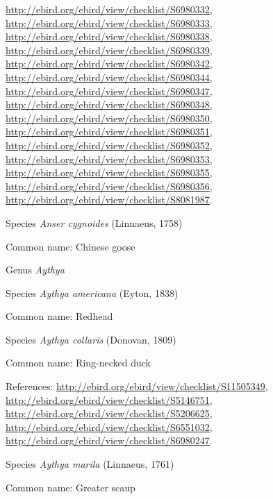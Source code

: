 \documentclass[9pt, article]{memoir}
\begin{document}
\begin{multicols}{2}
\url{http://ebird.org/ebird/view/checklist/S6980332}, 
\url{http://ebird.org/ebird/view/checklist/S6980333}, 
\url{http://ebird.org/ebird/view/checklist/S6980338}, 
\url{http://ebird.org/ebird/view/checklist/S6980339}, 
\url{http://ebird.org/ebird/view/checklist/S6980342}, 
\url{http://ebird.org/ebird/view/checklist/S6980344}, 
\url{http://ebird.org/ebird/view/checklist/S6980347}, 
\url{http://ebird.org/ebird/view/checklist/S6980348}, 
\url{http://ebird.org/ebird/view/checklist/S6980350}, 
\url{http://ebird.org/ebird/view/checklist/S6980351}, 
\url{http://ebird.org/ebird/view/checklist/S6980352}, 
\url{http://ebird.org/ebird/view/checklist/S6980353}, 
\url{http://ebird.org/ebird/view/checklist/S6980355}, 
\url{http://ebird.org/ebird/view/checklist/S6980356}, 
\url{http://ebird.org/ebird/view/checklist/S8081987}.

\vspace{6pt}\noindent\hspace{36pt}Species \textit{Anser cygnoides} (Linnaeus, 1758)


Common name: Chinese goose

\vspace{6pt}\noindent\hspace{30pt}Genus \textit{Aythya}


\vspace{6pt}\noindent\hspace{36pt}Species \textit{Aythya americana} (Eyton, 1838)


Common name: Redhead

\vspace{6pt}\noindent\hspace{36pt}Species \textit{Aythya collaris} (Donovan, 1809)


Common name: Ring-necked duck

References: 
\url{http://ebird.org/ebird/view/checklist/S11505349}, 
\url{http://ebird.org/ebird/view/checklist/S5146751}, 
\url{http://ebird.org/ebird/view/checklist/S5206625}, 
\url{http://ebird.org/ebird/view/checklist/S6551032}, 
\url{http://ebird.org/ebird/view/checklist/S6980247}.

\vspace{6pt}\noindent\hspace{36pt}Species \textit{Aythya marila} (Linnaeus, 1761)


Common name: Greater scaup


\end{multicols}
\end{document}
